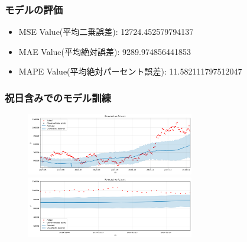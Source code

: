\documentclass{beamer}  %
\begin{document}
\begin{frame}
    \frametitle{モデルの評価}
\begin{itemize}
   \item  MSE Value(平均二乗誤差): 12724.452579794137\\
   \item  MAE Value(平均絶対誤差): 9289.974856441853\\
   \item  MAPE Value(平均絶対パーセント誤差): 11.582111797512047
\end{itemize}
\end{frame}

\begin{frame}
    \frametitle{祝日含みでのモデル訓練}
    \begin{figure}[h]
        \begin{center}
            \includegraphics[keepaspectratio, width=0.65\textwidth]{pic/pp_fcst2_1.png}\\
            \includegraphics[keepaspectratio, width=0.65\textwidth]{pic/pp_fcst2_2.png}\\
        \end{center}
    \end{figure}
\end{frame}
\end{document}

